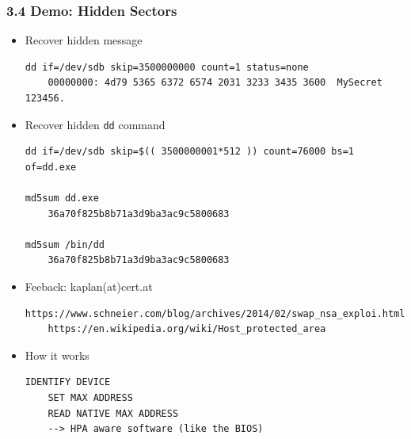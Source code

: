 \begin{frame}[fragile]
  \frametitle{3.4 Demo: Hidden Sectors}
    \begin{itemize}
        \item Recover hidden message
\begin{lstlisting}[basicstyle=\tiny]
dd if=/dev/sdb skip=3500000000 count=1 status=none
    00000000: 4d79 5365 6372 6574 2031 3233 3435 3600  MySecret 123456.
\end{lstlisting}
	\item Recover hidden \texttt{dd} command
\begin{lstlisting}[basicstyle=\tiny]
dd if=/dev/sdb skip=$(( 3500000001*512 )) count=76000 bs=1 of=dd.exe

md5sum dd.exe
    36a70f825b8b71a3d9ba3ac9c5800683

md5sum /bin/dd
    36a70f825b8b71a3d9ba3ac9c5800683
\end{lstlisting}
        \item Feeback: kaplan(at)cert.at
\begin{lstlisting}[basicstyle=\tiny]
    https://www.schneier.com/blog/archives/2014/02/swap_nsa_exploi.html
    https://en.wikipedia.org/wiki/Host_protected_area
\end{lstlisting}
        \item How it works
\begin{lstlisting}[basicstyle=\tiny]
    IDENTIFY DEVICE
    SET MAX ADDRESS
    READ NATIVE MAX ADDRESS
    --> HPA aware software (like the BIOS)
\end{lstlisting}
    \end{itemize}
\end{frame}


